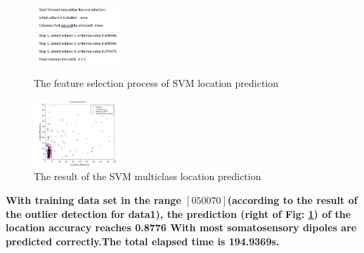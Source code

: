 \documentclass[5p]{elsarticle}
\begin{document}
\begin{frontmatter}
\begin{figure}[h!]
\begin{minipage}
    \begin{center}
    \includegraphics[width=0.3\textwidth]{SVM_BD_LOC_Fs.PNG}
  \end{center}
  \caption{The feature selection process of SVM location prediction}
  \end{minipage}
  \begin{minipage}
    \begin{center}
    \includegraphics[width=0.3\textwidth]{SVM_bd_loc_pred_tr.PNG}
    \end{center}
  \caption{The result of the SVM multiclass location prediction}
    \end{minipage}
    \label{fig_15}
\end{figure} 

\bf With training data set in the range $[0 50 0 70]$(according to the result of the outlier detection for data1), the prediction (right of Fig: \ref{fig_15}) of the location accuracy reaches 0.8776 With most somatosensory dipoles are predicted correctly.The total elapsed time is 194.9369s.  



\end{frontmatter}
\end{document}
